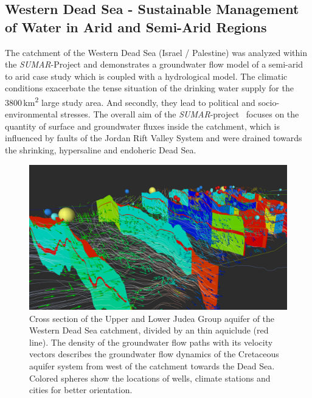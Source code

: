 \documentclass[twocolumn]{svjour3}          %
\begin{document}
\subsection{Western Dead Sea - Sustainable Management of Water in Arid and Semi-Arid
Regions}
\label{western-dead-sea---sustainable-management-of-water-in-arid-and-semi-arid-regions}

The catchment of the Western Dead Sea (Israel / Palestine) was analyzed within the \emph{SUMAR}-Project and de\-mon\-strates a groundwater flow model of a semi-arid to arid case study which is coupled with a hydrological model. The climatic conditions exacerbate the tense situation of the drinking water supply for the 3800\,km\textsuperscript{2} large study area. And secondly, they lead to political and socio-environmental stresses. The overall aim of the \emph{SU\-MAR}-project~\cite{Siebert:2014} focuses on the quantity of surface and groundwater fluxes inside the catchment, which is influenced by faults of the Jordan Rift Valley System and were drained towards the shrinking, hypersaline and endoheric Dead Sea.

\begin{figure}[htb]
  \includegraphics[width=\linewidth]{images/deadsea.jpg}
\caption{Cross section of the Upper and Lower Judea Group aquifer of the Western Dead Sea catchment, divided by an thin aquiclude (red line). The density of the groundwater flow paths with its velocity vectors describes the groundwater flow dynamics of the Cretaceous aquifer system from west of the catchment towards the Dead Sea. Colored spheres show the locations of wells, climate stations and cities for better orientation.}
\label{fig:deadsea}
\end{figure}
\end{document}
